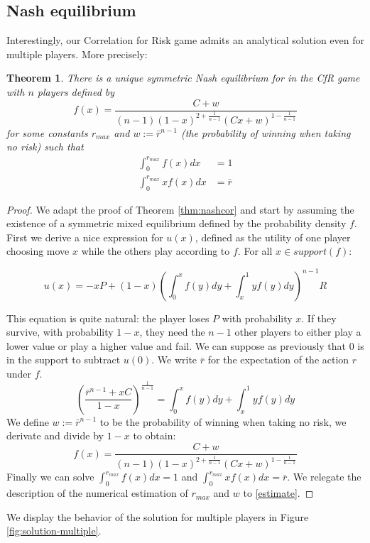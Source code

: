 \documentclass[preprint,12pt,authoryear]{elsarticle}
\newtheorem{theorem}{Theorem}[section]
\theoremstyle{definition}
\begin{document}
\subsection{Nash equilibrium}
Interestingly, our Correlation for Risk game admits an analytical solution even for multiple players. More precisely:
\begin{theorem}\label{thm:multiple}
    There is a unique symmetric Nash equilibrium for in the CfR game with $n$ players defined by $$f(x) = \frac{C + w}{(n-1)(1-x)^{2+\frac{1}{n-1}} (C x + w)^{1 - \frac{1}{n-1}}}$$
    for some constants $r_{max}$ and $w := \bar r ^ {n-1}$ (the probability of winning when taking no risk) such that 
    \begin{align*}
        \int_0^{r_{max}} f(x) dx &= 1 \\
        \int_0^{r_{max}} x f(x) dx &= \bar r 
    \end{align*}
\end{theorem} 
\begin{proof}
    
We adapt the proof of Theorem \ref{thm:nashcor} and start by assuming the existence of a symmetric mixed equilibrium defined by the probability density $f$. First we derive a nice expression for $u(x)$, defined as the utility of one player choosing move $x$ while the others play according to $f$. For all $x \in support(f)$:

$$u(x) = -x P + (1-x) \left( \int_0^x f(y) dy +\int_x^1 y f(y) dy \right)^{n-1} R$$

This equation is quite natural: the player loses $P$ with probability $x$. If they survive, with probability $1-x$, they need the $n-1$ other players to either play a lower value or play a higher value and fail. We can suppose as previously that $0$ is in the support to subtract $u(0)$. We write $\bar r$ for the expectation of the action $r$ under $f$.
$$\left(\frac{\bar r^{n-1} + x C}{1-x} \right)^\frac{1}{n-1} = \int_0^x f(y) dy + \int_x^1 y f(y) dy$$
We define $w := \bar r ^ {n-1}$ to be the probability of winning when taking no risk, we derivate and divide by $1-x$ to obtain:
$$f(x) = \frac{C + w}{(n-1)(1-x)^{2+\frac{1}{n-1}} (C x + w)^{1 - \frac{1}{n-1}}}$$
Finally we can solve $\int_0^{r_{max}} f(x) dx= 1$ and $\int_0^{r_{max}} x f(x) dx = \bar r$. We relegate the description of the numerical estimation of ${r_{max}}$ and $w$ to \ref{estimate}.
\end{proof}

We display the behavior of the solution for multiple players in Figure \ref{fig:solution-multiple}.
\end{document}
